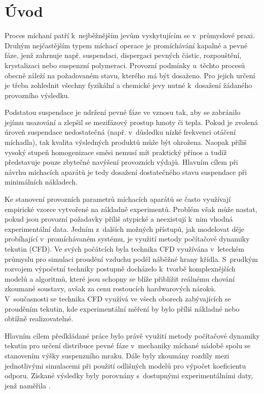 \chapter{Úvod}
Proces míchaní patří k~nejběžnějším jevům vyskytujícím se v~průmyslové praxi. Druhým nejčastějším typem míchací operace je promíchávání kapalné a pevné fáze, jenž zahrnuje např. suspendaci, dispergaci pevných částic, rozpouštění, krystalizaci nebo sus\-pen\-zní polymeraci. Provozní podmínky u~těchto procesů obecně záleží na požadovaném stavu, kterého má být dosaženo. Pro jejich určení je třeba zohlednit všechny fyzikální a chemické jevy nutné k~dosažení žádaného provozního výsledku. 

Podstatou suspendace je udržení pevné fáze ve vznosu tak, aby se zabránilo jejímu usazování a zlepšil se mezifázový prostup hmoty či tepla. Pokud je zvolená úroveň suspendace nedostatečná (např. v~důsledku nízké frekvenci otáčení míchadla), tak kvalita výsledných produktů může být ohrožena. Naopak příliš vysoký stupeň homogenizace směsi nemusí mít praktický přínos a tudíž představuje pouze zbytečné navýšení provozních výdajů. Hlavním cílem při návrhu míchacích aparátů je tedy dosažení dostatečného stavu suspendace při minimálních nákladech. 

Ke stanovení provozních parametrů míchacích aparátů se často využívají empirické vzorce vytvořené na základně experimentů. Problém však může nastat, pokud jsou provozní po\-ža\-dav\-ky příliš atypické a neexistují k~nim vhodná experimentální data. Jedním z~dalších možných přístupů, jak modelovat děje pro\-bí\-ha\-jí\-cí v~promíchávaném systému, je využití metody po\-čí\-ta\-čo\-vé dynamiky tekutin (CFD). 
Ve svých počátcích byla technika CFD využívána v~leteckém průmyslu pro simulaci proudění vzduchu podél náběžné hrany křídla. 
S~prudkým rozvojem výpočetní techniky postupně docházelo k~tvorbě komplexnějších modelů a algoritmů, které jsou schopny se blíže přiblížit reálnému chování zkoumané soustavy, avšak za cenu rostoucích hardwarových nároků. V~sou\-čas\-nos\-ti se technika CFD využívá ve všech oborech zabývajících se prouděním tekutin, kde experimentální měření by bylo příliš nákladné nebo obtížně realizovatelné.   

Hlavním cílem předkládané práce bylo právě využití metody počítačové dynamiky tekutin pro určení distribuce pevné fáze v~mechaniky míchané nádobě spolu se stanovením výšky suspenzního mraku. Dále byly zkoumány rozdíly mezi jednotlivými simulacemi při použití odlišných modelů pro výpočet koeficientu odporu.  Získané výsledky byly porovnány s~dostupnými experimentálními daty, jenž naměřila \citet{pav11}.
